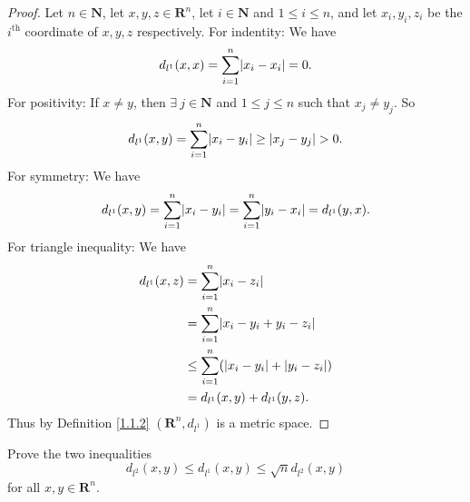 \begin{proof}
    Let \(n \in \mathbf{N}\), let \(x, y, z \in \mathbf{R}^n\), let \(i \in \mathbf{N}\) and \(1 \leq i \leq n\), and let \(x_i, y_i, z_i\) be the \(i^{\text{th}}\) coordinate of \(x, y, z\) respectively.
    For indentity:
    We have
    \[
        d_{l^1}(x, x) = \sum_{i = 1}^n \abs*{x_i - x_i} = 0.
    \]
    For positivity:
    If \(x \neq y\), then \(\exists\ j \in \mathbf{N}\) and \(1 \leq j \leq n\) such that \(x_j \neq y_j\).
    So
    \[
        d_{l^1}(x, y) = \sum_{i = 1}^n \abs*{x_i - y_i} \geq \abs*{x_j - y_j} > 0.
    \]
    For symmetry:
    We have
    \[
        d_{l^1}(x, y) = \sum_{i = 1}^n \abs*{x_i - y_i} = \sum_{i = 1}^n \abs*{y_i - x_i} = d_{l^1}(y, x).
    \]
    For triangle inequality:
    We have
    \begin{align*}
        d_{l^1}(x, z) & = \sum_{i = 1}^n \abs*{x_i - z_i}                         \\
                      & = \sum_{i = 1}^n \abs*{x_i - y_i + y_i - z_i}             \\
                      & \leq \sum_{i = 1}^n (\abs*{x_i - y_i} + \abs*{y_i - z_i}) \\
                      & = d_{l^1}(x, y) + d_{l^1}(y, z).
    \end{align*}
    Thus by Definition \ref{1.1.2} \((\mathbf{R}^n, d_{l^1})\) is a metric space.
\end{proof}

\begin{exercise}\label{ex 1.1.8}
    Prove the two inequalities
    \[
        d_{l^2}(x, y) \leq d_{l^1}(x, y) \leq \sqrt{n} d_{l^2}(x, y)
    \]
    for all \(x, y \in \mathbf{R}^n\).
\end{exercise}


